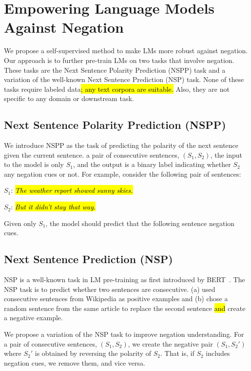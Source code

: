 \section{Empowering Language Models Against Negation}
\label{sec:empowering}

We propose a self-supervised method to make LMs more robust against negation.
Our approach is to further pre-train LMs on two tasks that involve negation.
These tasks are the Next Sentence Polarity Prediction (NSPP) task 
and a variation of the well-known Next Sentence Prediction (NSP) task.
None of these tasks require labeled data\hl{;
any text corpora are suitable.}
Also, they are not specific to any domain or downstream task.



\subsection{Next Sentence Polarity Prediction (NSPP)}
\label{sec:nspp}
We introduce NSPP as the task of predicting the polarity of the next sentence given the current sentence.
 a pair of consecutive sentences, $(S_1, S_2)$, 
the input to the model is only $S_1$, 
and the output is a binary label indicating whether $S_2$  any negation cues or not.
For example, consider the following pair of sentences:
\begin{compactitem}
  \item[] $S_1$: \hl{\textit{The weather report showed sunny skies.}}%
  \item[] $S_2$: \hl{\textit{But it didn’t stay that way.}}%
\end{compactitem}
Given only $S_1$,
the model should predict that the following sentence  negation cues.



\subsection{Next Sentence Prediction (NSP)}
\label{sec:nsp}
NSP is a well-known task in LM pre-training as first introduced by BERT~\cite{devlin-etal-2019-bert}.
The NSP task is to predict whether two sentences are consecutive.
\citet{devlin-etal-2019-bert} (a) used consecutive sentences from Wikipedia as positive examples 
and (b) chose a random sentence from the same article to replace the second sentence \hl{and} create a negative example.

We propose a variation of the NSP task to improve negation understanding.
For a pair of consecutive sentences, $(S_1, S_2)$,
we create the negative pair $(S_1, S_2')$ 
where $S_2'$ is obtained by reversing the polarity of $S_2$. 
That is, if $S_2$ includes negation cues, we remove them, 
and vice versa. 